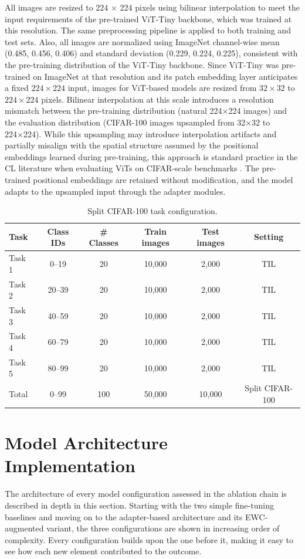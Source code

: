 \documentclass[english, LaM, oneside]{sapthesis}%
\numberwithin{equation}{chapter}
\begin{document}
All images are resized to 224 × 224 pixels using bilinear interpolation to meet the input requirements of the pre-trained ViT-Tiny backbone, which was trained at this resolution. The same preprocessing pipeline is applied to both training and test sets. Also, all images are normalized using ImageNet channel-wise mean (0.485, 0.456, 0.406) and standard deviation (0.229, 0.224, 0.225), consistent with the pre-training distribution of the ViT-Tiny backbone. Since ViT-Tiny was pre-trained on ImageNet at that resolution and its patch embedding layer anticipates a fixed $224\times224$ input, images for ViT-based models are resized from $32\times32$ to $224\times224$ pixels. Bilinear interpolation at this scale introduces a resolution mismatch between the pre-training distribution (natural 224×224 images) and the evaluation distribution (CIFAR-100 images upsampled from 32×32 to 224×224). While this upsampling may introduce interpolation artifacts and partially misalign with the spatial structure assumed by the positional embeddings learned during pre-training, this approach is standard practice in the CL literature when evaluating ViTs on CIFAR-scale benchmarks \cite{5}\cite{41}. The pre-trained positional embeddings are retained without modification, and the model adapts to the upsampled input through the adapter modules.

\begin{table}[h]
\centering
\caption{Split CIFAR-100 task configuration.}
\label{tab:4.1}
\small
\renewcommand{\arraystretch}{1.2}
\begin{tabular*}{\textwidth}{@{\extracolsep{\fill}}lccccc@{}}
\toprule
\textbf{Task} & \textbf{Class IDs} & \textbf{\# Classes} & \textbf{Train images} & \textbf{Test images} & \textbf{Setting} \\
\midrule
Task 1 & 0--19  & 20  & 10,000 & 2,000  & TIL \\
Task 2 & 20--39 & 20  & 10,000 & 2,000  & TIL \\
Task 3 & 40--59 & 20  & 10,000 & 2,000  & TIL \\
Task 4 & 60--79 & 20  & 10,000 & 2,000  & TIL \\
Task 5 & 80--99 & 20  & 10,000 & 2,000  & TIL \\
\midrule
Total  & 0--99  & 100 & 50,000 & 10,000 & Split CIFAR-100 \\
\bottomrule
\end{tabular*}
\end{table}

\section{Model Architecture Implementation}
\label{sec:4.3}
The architecture of every model configuration assessed in the ablation chain is described in depth in this section. Starting with the two simple fine-tuning baselines and moving on to the adapter-based architecture and its EWC-augmented variant, the three configurations are shown in increasing order of complexity. Every configuration builds upon the one before it, making it easy to see how each new element contributed to the outcome. 
\end{document}
